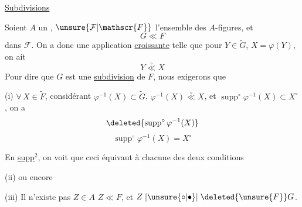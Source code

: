
\uline{Subdivisions}

Soient $A$ un  , $\unsure{\mathcal{F}|\mathscr{F}}$ l'ensemble des $A$-figures, et
\[
G\ll F
\]
dans $\mathcal{F}$. On a donc une application \uline{croissante}
telle que pour $Y\in\widetilde{G}$, $X=\varphi(Y)$, on ait
\[
Y\overset{\circ}{\ll}X
\]
Pour dire que $G$ est une  \uline{subdivision} de $F$, nous exigerons  que

(i) $\forall\,X\in\widetilde{F}$,  considérant $\varphi^{-1}(X)\subset\widetilde{G}$,
$\varphi^{-1}(X)\overset{\circ}{\ll}X$, et $\operatorname{supp}^{\circ}\varphi^{-1}(X)\subset X^{\circ}$, on a
\[
\deleted{\operatorname{supp}^{\circ}\varphi^{-1}(X)}
\]
\[
\operatorname{supp}^{\circ}\varphi^{-1}(X)=X^{\circ}
\]

En  \uline{ supp$^2$}, on voit que ceci équivaut à chacune des deux conditions

(ii)
ou encore

(iii) Il n'existe pas $Z\in A$  $Z\ll F$, et $Z\mathrel{|\unsure{\circ|\bullet}|}\deleted{\unsure{F}}G$.
